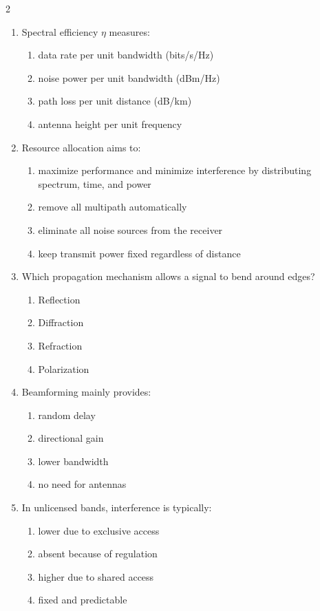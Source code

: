 \begin{multicols}{2}
\begin{enumerate}[leftmargin=*, itemsep=0.4em]
\item Spectral efficiency $\eta$ measures:
\begin{enumerate}[label=\alph*)]
\item data rate per unit bandwidth (bits/s/Hz)
\item noise power per unit bandwidth (dBm/Hz)
\item path loss per unit distance (dB/km)
\item antenna height per unit frequency
\end{enumerate}

\item Resource allocation aims to:
\begin{enumerate}[label=\alph*)]
\item maximize performance and minimize interference by distributing spectrum, time, and power
\item remove all multipath automatically
\item eliminate all noise sources from the receiver
\item keep transmit power fixed regardless of distance
\end{enumerate}

\item Which propagation mechanism allows a signal to bend around edges?
\begin{enumerate}[label=\alph*)]
\item Reflection
\item Diffraction
\item Refraction
\item Polarization
\end{enumerate}

\item Beamforming mainly provides:
\begin{enumerate}[label=\alph*)]
\item random delay
\item directional gain
\item lower bandwidth
\item no need for antennas
\end{enumerate}

\item In unlicensed bands, interference is typically:
\begin{enumerate}[label=\alph*)]
\item lower due to exclusive access
\item absent because of regulation
\item higher due to shared access
\item fixed and predictable
\end{enumerate}


\end{enumerate}
\end{multicols}
